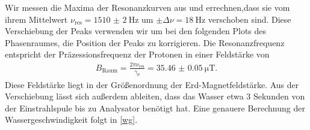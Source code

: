 \documentclass[paper=a4,
	fontsize=10pt,
	DIV=18,
	twocolumn,
	parskip=half
	]{scrartcl}
\numberwithin{equation}{section}    %
\begin{document}
Wir messen die Maxima der Resonanzkurven aus und errechnen,dass sie vom ihrem Mittelwert $\nu_{\mathrm{res}}=\SI{1510(2)}{\hertz}$ um  $\pm \Delta \nu=\SI{18}{\hertz}$ verschoben sind.
Diese Verschiebung der Peaks verwenden wir um bei den folgenden Plots des Phasenraumes, die Position der Peaks zu korrigieren.
Die Resonanzfrequenz entspricht der Präzessionsfrequenz der Protonen in einer Feldstärke von 
\begin{align}
	B_{\mathrm{Raum}}=\frac{2 \pi \nu_{\mathrm{res}}}{\gamma_p}=\SI[separate-uncertainty=false]{35.46(5)}{\micro\tesla}.
\end{align}
Diese Feldstärke liegt in der Größenordnung der Erd-Magnetfeldstärke.
Aus der Verschiebung lässt sich außerdem ableiten, dass das Wasser etwa $3$ Sekunden von der Einstrahlspule bis zu Analysator benötigt hat.
Eine genauere Berechnung der Wassergeschwindigkeit folgt in \ref{wg}.
\end{document}
